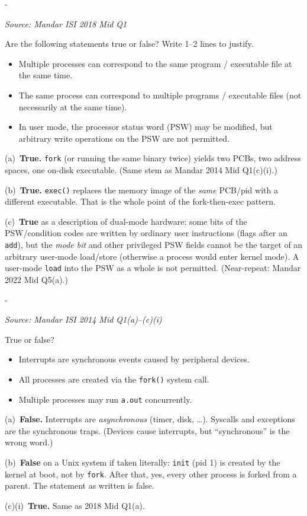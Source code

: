 \documentclass[11pt,a4paper]{article}
\makeatletter
\newcommand{\keepspace}[1]{\par\penalty-100\begingroup
  \setlength{\dimen@}{#1}\dimen@ii\pagegoal\advance\dimen@ii-\pagetotal
  \ifdim\dimen@>\dimen@ii\ifdim\dimen@ii>\z@\vfil\fi\break\fi\endgroup}
\newcounter{qn}[section]
\newenvironment{Qn}[4]{%
  \refstepcounter{qn}\keepspace{7\baselineskip}%
  \begin{tcolorbox}[qboxstyle, title={Q\thesection.\theqn\ \ [#1 \textbar\ #2]\ \ #4}]%
  {\footnotesize\color{g3}\textit{Source: #3}}\par\smallskip%
}{%
  \end{tcolorbox}%
}
\newenvironment{Sol}{%
  \begin{tcolorbox}[sboxstyle, title={Solution}]%
}{%
  \end{tcolorbox}\vspace{0.35em}%
}
\makeatother
\begin{document}
\begin{Qn}{Easy-Medium}{Lect 3}{Mandar ISI 2018 Mid Q1}{T/F: many procs per executable; one proc, many executables; PSW}
Are the following statements true or false? Write 1--2 lines to justify.
\begin{itemize}
  \item[(a)] Multiple processes can correspond to the same program / executable file at the same time.
  \item[(b)] The same process can correspond to multiple programs / executable files (not necessarily at the same time).
  \item[(c)] In user mode, the processor status word (PSW) may be modified, but arbitrary write operations on the PSW are not permitted.
\end{itemize}
\end{Qn}
\begin{Sol}
(a)~\textbf{True.} \texttt{fork} (or running the same binary twice) yields two PCBs, two address spaces, one on-disk executable. (Same stem as Mandar 2014 Mid Q1(c)(i).)

(b)~\textbf{True.} \texttt{exec()} replaces the memory image of the \emph{same} PCB/pid with a different executable. That is the whole point of the fork-then-exec pattern.

(c)~\textbf{True} as a description of dual-mode hardware: some bits of the PSW/condition codes are written by ordinary user instructions (flags after an \texttt{add}), but the \emph{mode bit} and other privileged PSW fields cannot be the target of an arbitrary user-mode load/store (otherwise a process would enter kernel mode). A user-mode \texttt{load} into the PSW as a whole is not permitted. (Near-repeat: Mandar 2022 Mid Q5(a).)
\end{Sol}

\begin{Qn}{Easy-Medium}{Lect 3--4}{Mandar ISI 2014 Mid Q1(a)--(c)(i)}{T/F: interrupts, \texttt{fork}, many processes on \texttt{a.out}}
True or false?
\begin{itemize}
  \item[(a)] Interrupts are synchronous events caused by peripheral devices.
  \item[(b)] All processes are created via the \texttt{fork()} system call.
  \item[(c)(i)] Multiple processes may run \texttt{a.out} concurrently.
\end{itemize}
\end{Qn}
\begin{Sol}
(a)~\textbf{False.} Interrupts are \emph{asynchronous} (timer, disk, \ldots). Syscalls and exceptions are the synchronous traps. (Devices cause interrupts, but ``synchronous'' is the wrong word.)

(b)~\textbf{False} on a Unix system if taken literally: \texttt{init} (pid 1) is created by the kernel at boot, not by \texttt{fork}. After that, yes, every other process is forked from a parent. The statement as written is false.

(c)(i)~\textbf{True.} Same as 2018 Mid Q1(a).
\end{Sol}
\end{document}
